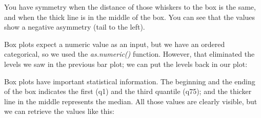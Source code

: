 \documentclass[]{article}
\newenvironment{Shaded}{\begin{snugshade}}{\end{snugshade}}
\newcommand{\KeywordTok}[1]{\textcolor[rgb]{0.13,0.29,0.53}{\textbf{#1}}}
\newcommand{\DataTypeTok}[1]{\textcolor[rgb]{0.13,0.29,0.53}{#1}}
\newcommand{\DecValTok}[1]{\textcolor[rgb]{0.00,0.00,0.81}{#1}}
\newcommand{\StringTok}[1]{\textcolor[rgb]{0.31,0.60,0.02}{#1}}
\newcommand{\CommentTok}[1]{\textcolor[rgb]{0.56,0.35,0.01}{\textit{#1}}}
\newcommand{\OperatorTok}[1]{\textcolor[rgb]{0.81,0.36,0.00}{\textbf{#1}}}
\newcommand{\NormalTok}[1]{#1}
\begin{document}
You have symmetry when the distance of those whiskers to the box is the
same, and when the thick line is in the middle of the box. You can see
that the values show a negative asymmetry (tail to the left).

Box plots expect a numeric value as an input, but we have an ordered
categorical, so we used the \emph{as.numeric()} function. However, that
eliminated the levels we saw in the previous bar plot; we can put the
levels back in our plot:

\begin{Shaded}
\end{Shaded}

Box plots have important statistical information. The beginning and the
ending of the box indicates the first (q1) and the third quantile (q75);
and the thicker line in the middle represents the median. All those
values are clearly visible, but we can retrieve the values like this:

\begin{Shaded}
\end{Shaded}
\end{document}
